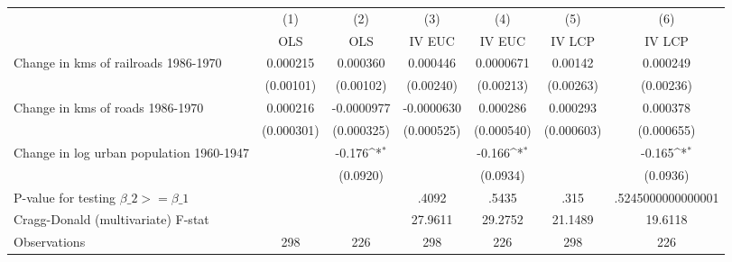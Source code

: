 {
\def\sym#1{\ifmmode^{#1}\else\(^{#1}\)\fi}
\begin{tabular}{l*{6}{c}}
\hline\hline
                &\multicolumn{1}{c}{(1)}&\multicolumn{1}{c}{(2)}&\multicolumn{1}{c}{(3)}&\multicolumn{1}{c}{(4)}&\multicolumn{1}{c}{(5)}&\multicolumn{1}{c}{(6)}\\
                &\multicolumn{1}{c}{OLS}&\multicolumn{1}{c}{OLS}&\multicolumn{1}{c}{IV EUC}&\multicolumn{1}{c}{IV EUC}&\multicolumn{1}{c}{IV LCP}&\multicolumn{1}{c}{IV LCP}\\
\hline
Change in kms of railroads 1986-1970& 0.000215         & 0.000360         & 0.000446         &0.0000671         &  0.00142         & 0.000249         \\
                &(0.00101)         &(0.00102)         &(0.00240)         &(0.00213)         &(0.00263)         &(0.00236)         \\
[1em]
Change in kms of roads 1986-1970& 0.000216         &-0.0000977         &-0.0000630         & 0.000286         & 0.000293         & 0.000378         \\
                &(0.000301)         &(0.000325)         &(0.000525)         &(0.000540)         &(0.000603)         &(0.000655)         \\
[1em]
Change in log urban population 1960-1947&                  &   -0.176\sym{*}  &                  &   -0.166\sym{*}  &                  &   -0.165\sym{*}  \\
                &                  & (0.0920)         &                  & (0.0934)         &                  & (0.0936)         \\
\hline
P-value for testing $\beta\_{2} >= \beta\_{1}$&                  &                  &    .4092         &    .5435         &     .315         &.5245000000000001         \\
Cragg-Donald (multivariate) F-stat&                  &                  &  27.9611         &  29.2752         &  21.1489         &  19.6118         \\
Observations    &      298         &      226         &      298         &      226         &      298         &      226         \\
\hline\hline
\end{tabular}
}
